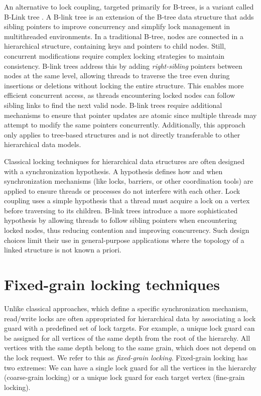 An alternative to lock coupling, targeted primarily for B-trees, is a variant called B-Link tree \cite{LehmanY81}. A B-link tree is an extension of the B-tree data structure that adds sibling pointers to improve concurrency and simplify lock management in multithreaded environments. In a traditional B-tree, nodes are connected in a hierarchical structure, containing keys and pointers to child nodes. Still, concurrent modifications require complex locking strategies to maintain consistency. B-link trees address this by adding \emph{right-sibling} pointers between nodes at the same level, allowing threads to traverse the tree even during insertions or deletions without locking the entire structure. This enables more efficient concurrent access, as threads encountering locked nodes can follow sibling links to find the next valid node. B-link trees require additional mechanisms to ensure that pointer updates are atomic since multiple threads may attempt to modify the same pointers concurrently. Additionally, this approach only applies to tree-based structures and is not directly transferable to other hierarchical data models.


Classical locking techniques for hierarchical data structures are often designed with a synchronization hypothesis. A hypothesis defines how and when synchronization mechanisms (like locks, barriers, or other coordination tools) are applied to ensure threads or processes do not interfere with each other. Lock coupling uses a simple hypothesis that a thread must acquire a lock on a vertex before traversing to its children. B-link trees introduce a more sophisticated hypothesis by allowing threads to follow sibling pointers when encountering locked nodes, thus reducing contention and improving concurrency. Such design choices limit their use in general-purpose applications where the topology of a linked structure is not known a priori. 

\section{Fixed-grain locking techniques}
Unlike classical approaches, which define a specific synchronization mechanism, read/write locks are often appropriated for hierarchical data by associating a lock guard with a predefined set of lock targets. For example, a unique lock guard can be assigned for all vertices of the same depth from the root of the hierarchy. All vertices with the same depth belong to the same grain, which does not depend on the lock request. We refer to this as \emph{fixed-grain locking}. 
Fixed-grain locking has two extremes: We can have a single lock guard for all the vertices in the hierarchy (coarse-grain locking) or a unique lock guard for each target vertex (fine-grain locking).


